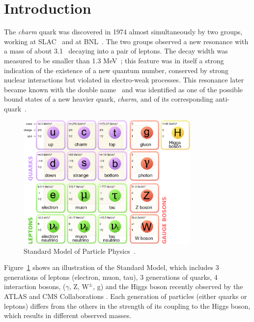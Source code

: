 \documentclass[12pt, a4paper, twoside, titlepage]{article}
\begin{document}
\section{Introduction}
The \emph{charm} quark was discovered in 1974 almost simultaneously by two groups, working at SLAC~\cite{Richter:1974} and at BNL~\cite{Ting:1974}.
The two groups observed a new resonance with a mass of about 3.1 \GeVcsq\ decaying into a pair of leptons.
The decay width was measured to be smaller than 1.3 MeV~\cite{Richter:1974}; this feature
was in itself a strong indication of the existence of a new quantum number, conserved by strong nuclear interactions 
but violated in electro-weak processes.
This resonance later became known with the double name \jpsi\ and was identified as one of the possible bound states
of a new heavier quark, \emph{charm}, and of its corresponding anti-quark~\cite{Appelquist:1975, DeRujula:1975}. 

\begin{figure}[tbh]
\begin{center}
\includegraphics[width=0.8\textwidth]{img/standard_model}
 \caption{Standard Model of Particle Physics~\cite{Wikipedia:StandardModel}.} 
 \label{fig:standard_model}
\end{center}
\end{figure}
Figure~\ref{fig:standard_model} shows an illustration of the Standard Model, which includes
3 generations of leptons (electron, muon, tau), 3 generations of quarks, 4 interaction bosons, ($\gamma$, Z, $\mathrm{W}^{\pm}$, g) and the Higgs boson
recently observed by the ATLAS and CMS Collaborations \cite{ATLAS:2012b,CMS:2012d}.
Each generation of particles (either quarks or leptons) differs from the others in the strength of its coupling to the Higgs boson,
which results in different observed masses.
\end{document}
